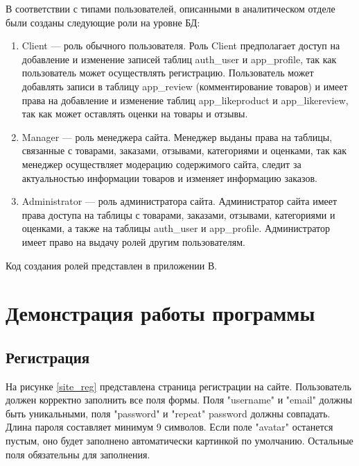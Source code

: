 В соответствии с типами пользователей, описанными в аналитическом отделе были созданы следующие роли на уровне БД:

\begin{enumerate}
	\item Client --- роль обычного пользователя. Роль Client предполагает доступ на добавление и изменение записей таблиц auth\_user и app\_profile, так как пользователь может осуществлять регистрацию. Пользователь может добавлять записи в таблицу app\_review (комментирование товаров) и имеет права на добавление и изменение таблиц app\_likeproduct и app\_likereview, так как может оставлять оценки на товары и отзывы.
	\item Manager --- роль менеджера сайта. Менеджер выданы права на таблицы, связанные с товарами, заказами, отзывами, категориями и оценками, так как менеджер осуществляет модерацию содержимого сайта, следит за актуальностью информации товаров и изменяет информацию заказов.
	\item Administrator --- роль администратора сайта. Администратор сайта имеет права доступа на таблицы с товарами, заказами, отзывами, категориями и оценками, а также на таблицы auth\_user и app\_profile. Администратор имеет право на выдачу ролей другим пользователям.
\end{enumerate}

Код создания ролей представлен в приложении В.

\newpage

\section{Демонстрация работы программы}

\subsection{Регистрация}

На рисунке \ref{site_reg} представлена страница регистрации на сайте. Пользователь должен корректно заполнить все поля формы. Поля "username" и "email" должны быть уникальными, поля "password" и "repeat" password должны совпадать. Длина пароля составляет минимум 9 символов. Если поле "avatar" останется пустым, оно будет заполнено автоматически картинкой по умолчанию. Остальные поля обязательны для заполнения.

